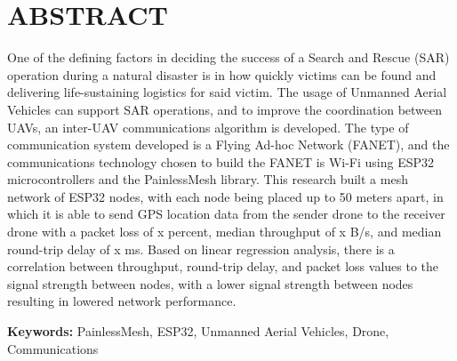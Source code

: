 \chapter*{ABSTRACT}

One of the defining factors in deciding the success of a Search and Rescue (SAR) operation during a natural disaster is in how quickly victims can be found and delivering life-sustaining logistics for said victim. The usage of Unmanned Aerial Vehicles can support SAR operations, and to improve the coordination between UAVs, an inter-UAV communications algorithm is developed. The type of communication system developed is a Flying Ad-hoc Network (FANET), and the communications technology chosen to build the FANET is Wi-Fi using ESP32 microcontrollers and the PainlessMesh library. This research built a mesh network of ESP32 nodes, with each node being placed up to 50 meters apart, in which it is able to send GPS location data from the sender drone to the receiver drone with a packet loss of x percent, median throughput of x B/s, and median round-trip delay of x ms. Based on linear regression analysis, there is a correlation between throughput, round-trip delay, and packet loss values to the signal strength between nodes, with a lower signal strength between nodes resulting in lowered network performance.

\vspace{2em}
\noindent \textbf{Keywords:} PainlessMesh, ESP32, Unmanned Aerial Vehicles, Drone, Communications